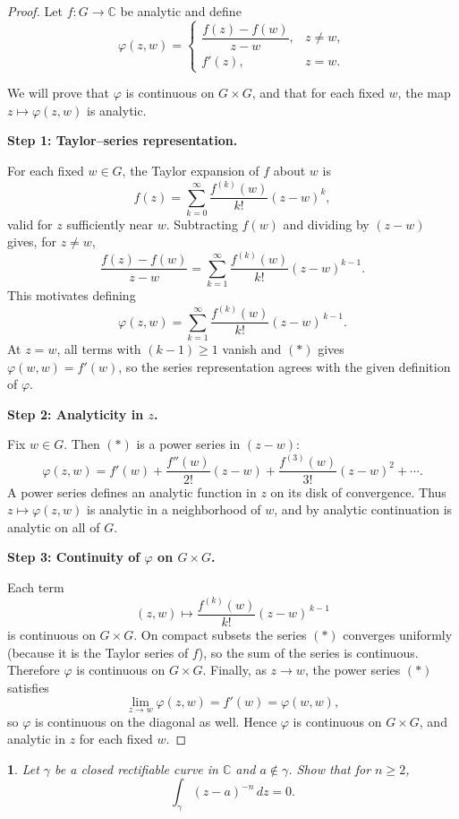 \documentclass[12pt, a4paper]{report}
\theoremstyle{spaced}
\newtheorem{exercise}{}
\newcommand{\setexercise}[1]{\setcounter{exercise}{#1-1}}
\begin{document}
\begin{proof}
	Let $f:G\to\mathbb{C}$ be analytic and define
	\[
		\varphi(z,w)=
		\begin{cases}
			\dfrac{f(z)-f(w)}{z-w}, & z\neq w, \\[6pt]
			f'(z),                  & z=w.
		\end{cases}
	\]

	We will prove that $\varphi$ is continuous on $G\times G$, and that for each fixed
	$w$, the map $z\mapsto \varphi(z,w)$ is analytic.

	\medskip
	\noindent\textbf{Step 1: Taylor–series representation.}

	For each fixed $w\in G$, the Taylor expansion of $f$ about $w$ is
	\[
		f(z)
		= \sum_{k=0}^{\infty} \frac{f^{(k)}(w)}{k!}(z-w)^k,
	\]
	valid for $z$ sufficiently near $w$.
	Subtracting $f(w)$ and dividing by $(z-w)$ gives, for $z\neq w$,
	\[
		\frac{f(z)-f(w)}{z-w}
		= \sum_{k=1}^{\infty} \frac{f^{(k)}(w)}{k!}(z-w)^{k-1}.
	\]
	This motivates defining
	\[
		\varphi(z,w)
		= \sum_{k=1}^{\infty} \frac{f^{(k)}(w)}{k!}(z-w)^{\,k-1}.
		\tag{*}
	\]
	At $z=w$, all terms with $(k-1)\ge1$ vanish and $(*)$ gives $\varphi(w,w)=f'(w)$,
	so the series representation agrees with the given definition of $\varphi$.

	\medskip
	\noindent\textbf{Step 2: Analyticity in $z$.}

	Fix $w\in G$.
	Then $(*)$ is a power series in $(z-w)$:
	\[
		\varphi(z,w)
		= f'(w) + \frac{f''(w)}{2!}(z-w)
		+ \frac{f^{(3)}(w)}{3!}(z-w)^2 + \cdots.
	\]
	A power series defines an analytic function in $z$ on its disk of convergence.
	Thus $z\mapsto \varphi(z,w)$ is analytic in a neighborhood of $w$, and by analytic
	continuation is analytic on all of $G$.

	\medskip
	\noindent\textbf{Step 3: Continuity of $\varphi$ on $G\times G$.}

	Each term
	\[
		(z,w)\mapsto \frac{f^{(k)}(w)}{k!}(z-w)^{\,k-1}
	\]
	is continuous on $G\times G$.
	On compact subsets the series $(*)$ converges uniformly (because it is the
	Taylor series of $f$), so the sum of the series is continuous.
	Therefore $\varphi$ is continuous on $G\times G$.
	Finally, as $z\to w$, the power series $(*)$ satisfies
	\[
		\lim_{z\to w} \varphi(z,w) = f'(w) = \varphi(w,w),
	\]
	so $\varphi$ is continuous on the diagonal as well.
	Hence $\varphi$ is continuous on $G\times G$, and analytic in $z$ for each fixed
	$w$.
\end{proof}

\setexercise{5}
\begin{exercise}
	Let $\gamma$ be a closed rectifiable curve in $\mathbb{C}$ and $a \notin \gamma$.
	Show that for $n \ge 2$,
	\[
		\int_{\gamma} (z-a)^{-n}\, dz = 0.
	\]
\end{exercise}
\end{document}
